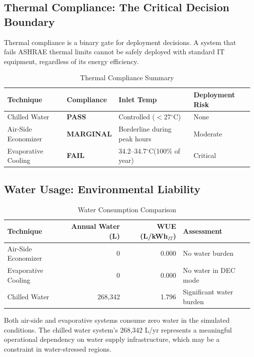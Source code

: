 ﻿\documentclass[12pt,a4paper]{report}
\newcommand{\pass}{\textcolor{passgreen}{\textbf{PASS}}}
\newcommand{\fail}{\textcolor{failred}{\textbf{FAIL}}}
\newcommand{\marginal}{\textcolor{warnorng}{\textbf{MARGINAL}}}
\newcommand{\degC}{$^{\circ}$C}
\begin{document}
\subsection{Thermal Compliance: The Critical Decision Boundary}

Thermal compliance is a binary gate for deployment decisions. A system that fails ASHRAE
thermal limits cannot be safely deployed with standard IT equipment, regardless of its
energy efficiency.

\begin{table}[H]
\centering
\caption{Thermal Compliance Summary}
\label{tab:thermal_compare}
\renewcommand{\arraystretch}{1.35}
\begin{tabular}{llll}
\toprule
\textbf{Technique} & \textbf{Compliance} & \textbf{Inlet Temp} & \textbf{Deployment Risk} \\
\midrule
Chilled Water & \pass & Controlled ($<$27\degC) & None \\
Air-Side Economizer & \marginal & Borderline during peak hours & Moderate \\
Evaporative Cooling & \fail & 34.2--34.7\degC (100\% of year) & Critical \\
\bottomrule
\end{tabular}
\end{table}

\subsection{Water Usage: Environmental Liability}

\begin{table}[H]
\centering
\caption{Water Consumption Comparison}
\label{tab:water_compare}
\renewcommand{\arraystretch}{1.35}
\begin{tabular}{lrrl}
\toprule
\textbf{Technique} & \textbf{Annual Water (L)} & \textbf{WUE (L/kWh$_{IT}$)} & \textbf{Assessment} \\
\midrule
Air-Side Economizer & 0 & 0.000 & No water burden \\
Evaporative Cooling & 0 & 0.000 & No water in DEC mode \\
Chilled Water & 268{,}342 & 1.796 & Significant water burden \\
\bottomrule
\end{tabular}
\end{table}

\noindent Both air-side and evaporative systems consume zero water in the simulated conditions.
The chilled water system's 268{,}342 L/yr represents a meaningful operational dependency
on water supply infrastructure, which may be a constraint in water-stressed regions.
\end{document}
